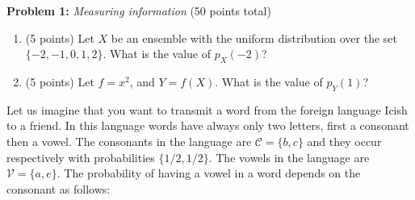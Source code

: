 \noindent \textbf{Problem 1:} \emph{Measuring information} (50 points total)\\
\begin{enumerate}
\item (5 points) Let $X$ be an ensemble with the uniform distribution over the set $\{-2,-1,0,1,2\}$. What is the value of $p_X(-2)$?

\noindent{}
\item (5 points) Let $f=x^2$, and $Y=f(X)$. What is the value of $p_Y(1)$?

\noindent{}
\end{enumerate}
Let us imagine that you want to transmit a word from the foreign language Icish to a friend. 
In this language words have always only two letters, first a consonant then a vowel. 
The consonants in the language are $\mathcal C=\{b,c\}$ and they occur respectively with probabilities $\{1/2,1/2\}$. 
The vowels in the language are $\mathcal V=\{a,e\}$. The probability of having a vowel in a word depends on the consonant as follows:

